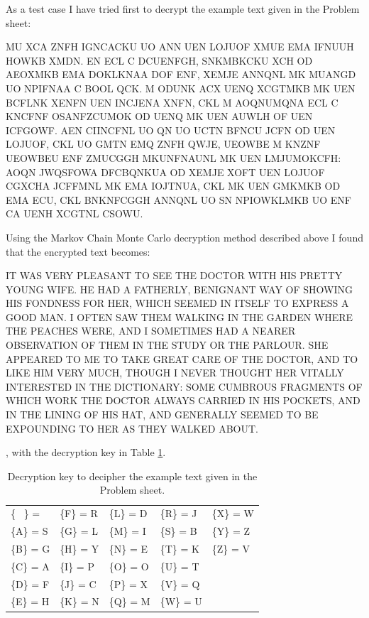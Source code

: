 \documentclass[a4paper, 11pt]{article}
\begin{document}
As a test case I have tried first to decrypt the example text given in the
Problem sheet:

\begin{adjustwidth}{2.5em}{0pt}
  \small
  MU XCA ZNFH IGNCACKU UO ANN UEN LOJUOF XMUE EMA IFNUUH
  HOWKB XMDN. EN ECL C DCUENFGH, SNKMBKCKU XCH OD AEOXMKB
  EMA DOKLKNAA DOF ENF, XEMJE ANNQNL MK MUANGD UO NPIFNAA 
  C BOOL QCK. M ODUNK ACX UENQ XCGTMKB MK UEN BCFLNK
  XENFN UEN INCJENA XNFN, CKL M AOQNUMQNA ECL C KNCFNF
  OSANFZCUMOK OD UENQ MK UEN AUWLH OF UEN ICFGOWF. AEN
  CIINCFNL UO QN UO UCTN BFNCU JCFN OD UEN LOJUOF, CKL UO
  GMTN EMQ ZNFH QWJE, UEOWBE M KNZNF UEOWBEU ENF ZMUCGGH
  MKUNFNAUNL MK UEN LMJUMOKCFH: AOQN JWQSFOWA DFCBQNKUA
  OD XEMJE XOFT UEN LOJUOF CGXCHA JCFFMNL MK EMA IOJTNUA,
  CKL MK UEN GMKMKB OD EMA ECU, CKL BNKNFCGGH ANNQNL UO
  SN NPIOWKLMKB UO ENF CA UENH XCGTNL CSOWU.
\end{adjustwidth}

Using the Markov Chain Monte Carlo decryption method described above I found 
that the encrypted text becomes:

\begin{adjustwidth}{2.5em}{0pt}
  \small
  IT WAS VERY PLEASANT TO SEE THE DOCTOR WITH HIS PRETTY
  YOUNG WIFE. HE HAD A FATHERLY, BENIGNANT WAY OF SHOWING
  HIS FONDNESS FOR HER, WHICH SEEMED IN ITSELF TO EXPRESS 
  A GOOD MAN. I OFTEN SAW THEM WALKING IN THE GARDEN
  WHERE THE PEACHES WERE, AND I SOMETIMES HAD A NEARER
  OBSERVATION OF THEM IN THE STUDY OR THE PARLOUR. SHE
  APPEARED TO ME TO TAKE GREAT CARE OF THE DOCTOR, AND TO
  LIKE HIM VERY MUCH, THOUGH I NEVER THOUGHT HER VITALLY
  INTERESTED IN THE DICTIONARY: SOME CUMBROUS FRAGMENTS
  OF WHICH WORK THE DOCTOR ALWAYS CARRIED IN HIS POCKETS,
  AND IN THE LINING OF HIS HAT, AND GENERALLY SEEMED TO
  BE EXPOUNDING TO HER AS THEY WALKED ABOUT.
\end{adjustwidth}

, with the decryption key in Table \ref{tab:ExampleKey}.

\begin{table}[h]
  \centering
  \caption{Decryption key to decipher the example text given in the
  Problem sheet.}
  \begin{tabular}{l l l l l}
\{ \ \} =    &  \{F\} = R  &  \{L\} = D  &  \{R\} = J  &  \{X\} = W  \\
\{A\} = S  &  \{G\} = L  &  \{M\} = I  &  \{S\} = B  &  \{Y\} = Z  \\
\{B\} = G  &  \{H\} = Y  &  \{N\} = E  &  \{T\} = K  &  \{Z\} = V  \\
\{C\} = A  &  \{I\} = P  &  \{O\} = O  &  \{U\} = T  &  \ \\
\{D\} = F  &  \{J\} = C  &  \{P\} = X  &  \{V\} = Q  &  \ \\
\{E\} = H  &  \{K\} = N  &  \{Q\} = M  &  \{W\} = U  &  \ \\
  \end{tabular}
  \label{tab:ExampleKey}
\end{table}
\end{document}
